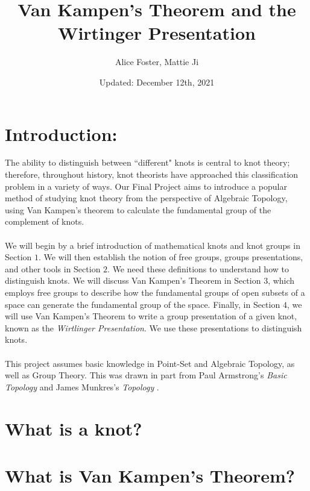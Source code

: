\documentclass{article}
\title{Van Kampen's Theorem and the Wirtinger Presentation}
\author{Alice Foster, Mattie Ji}
\date{Updated: December 12th, 2021}
\begin{document}
\maketitle



\section*{Introduction:}
The ability to distinguish between ``different" knots is central to knot theory; therefore, throughout history, knot theorists have approached this classification problem in a variety of ways. Our Final Project aims to introduce a popular method of studying knot theory from the perspective of Algebraic Topology, using Van Kampen's theorem to calculate the fundamental group of the complement of knots.\\\\
We will begin by a brief introduction of mathematical knots and knot groups in Section $1$. We will then establish the notion of free groups, groups presentations, and other tools in Section $2$. We need these definitions to understand how to distinguish knots. We will discuss Van Kampen's Theorem in Section $3$, which employs free groups to describe how the fundamental groups of open subsets of a space can generate the fundamental group of the space. Finally, in Section $4$, we will use Van Kampen's Theorem to write a group presentation of a given knot, known as the \textit{Wirtlinger Presentation}. We use these presentations to distinguish knots.\\\\
This project assumes basic knowledge in Point-Set and Algebraic Topology, as well as Group Theory. This was drawn in part from Paul Armstrong's \textit{Basic Topology} \cite{armstrong_1983} and James Munkres's \textit{Topology} \cite{munkres2000topology}.

\tableofcontents

\newpage
\section{What is a knot?}


\newpage


\newpage
\section{What is Van Kampen's Theorem?}

\end{document}
